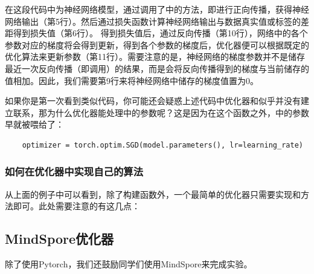 在这段代码中为神经网络模型，通过调用了中的方法，即进行正向传播，获得神经网络输出（第5行）。然后通过损失函数计算神经网络输出与数据真实值或标签的差距得到损失值（第6行）。
得到损失值后，通过反向传播（第10行），网络中的各个参数对应的梯度将会得到更新，得到各个参数的梯度后，优化器便可以根据既定的优化算法来更新参数（第11行）。需要注意的是，神经网络的梯度参数并不是储存最近一次反向传播（即调用）的结果，而是会将反向传播得到的梯度与当前储存的值相加。因此，我们需要第9行来将神经网络中储存的梯度值置为0。

如果你是第一次看到类似代码，你可能还会疑惑上述代码中优化器和似乎并没有建立联系，那为什么优化器能处理中的参数呢？这是因为在这个函数之外，中的参数早就被喂给了：
\begin{lstlisting}
    optimizer = torch.optim.SGD(model.parameters(), lr=learning_rate)
\end{lstlisting}

\subsubsection{如何在优化器中实现自己的算法}

从上面的例子中可以看到，除了构建函数外，一个最简单的优化器只需要实现和方法即可。此处需要注意的有这几点：

\subsection{MindSpore优化器}

除了使用Pytorch，我们还鼓励同学们使用MindSpore来完成实验。

